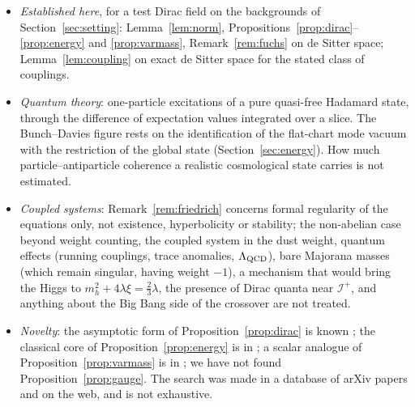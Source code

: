 \documentclass[11pt,a4paper]{article}
\theoremstyle{definition}
\newcommand{\scri}{\mathscr{I}^{+}}
\begin{document}
\begin{itemize}[leftmargin=1.5em]
\item \emph{Established here}, for a test Dirac field on the backgrounds of Section~\ref{sec:setting}: Lemma~\ref{lem:norm}, Propositions~\ref{prop:dirac}--\ref{prop:energy} and \ref{prop:varmass}, Remark~\ref{rem:fuchs} on de Sitter space; Lemma~\ref{lem:coupling} on exact de Sitter space for the stated class of couplings.
\item \emph{Quantum theory}: one-particle excitations of a pure quasi-free Hadamard state, through the difference of expectation values integrated over a slice. The Bunch--Davies figure rests on the identification of the flat-chart mode vacuum with the restriction of the global state (Section~\ref{sec:energy}). How much particle--antiparticle coherence a realistic cosmological state carries is not estimated.
\item \emph{Coupled systems}: Remark~\ref{rem:friedrich} concerns formal regularity of the equations only, not existence, hyperbolicity or stability; the non-abelian case beyond weight counting, the coupled system in the dust weight, quantum effects (running couplings, trace anomalies, $\Lambda_{\rm QCD}$), bare Majorana masses (which remain singular, having weight $-1$), a mechanism that would bring the Higgs to $m_{h}^{2}+4\lambda\xi=\tfrac23\lambda$, the presence of Dirac quanta near $\scri$, and anything about the Big Bang side of the crossover are not treated.
\item \emph{Novelty}: the asymptotic form of Proposition~\ref{prop:dirac} is known \cite{DFMR2019,Ibison2011}; the classical core of Proposition~\ref{prop:energy} is in \cite{Ibison2011}; a scalar analogue of Proposition~\ref{prop:varmass} is in \cite{Bachelot2020}; we have not found Proposition~\ref{prop:gauge}. The search was made in a database of arXiv papers and on the web, and is not exhaustive.
\end{itemize}
\end{document}
